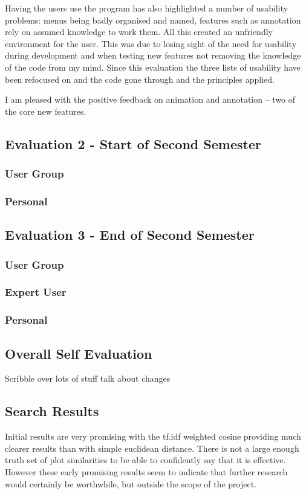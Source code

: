 Having the users use the program has also highlighted a number of usability problems: menus being badly organised and named, features such as annotation rely on assumed knowledge to work them.  All this created an unfriendly environment for the user.  This was due to losing sight of the need for usability during development and when testing new features not removing the knowledge of the code from my mind.  Since this evaluation the three lists of usability have been refocused on and the code gone through and the principles applied.

I am pleased with the positive feedback on animation and annotation -- two of the core new features.

\subsection{Evaluation 2 - Start of Second Semester}
\subsubsection{User Group}
\subsubsection{Personal}

\subsection{Evaluation 3 - End of Second Semester}
\subsubsection{User Group}
\subsubsection{Expert User}
\subsubsection{Personal}

\subsection{Overall Self Evaluation}
Scribble over lots of stuff talk about changes


\subsection{Search Results}
Initial results are very promising with the tf.idf weighted cosine providing much clearer results than with simple euclidean distance.  There is not a large enough truth set of plot similarities to be able to confidently say that it is effective.  However these early promising results seem to indicate that further research would certainly be worthwhile, but outside the scope of the project.
